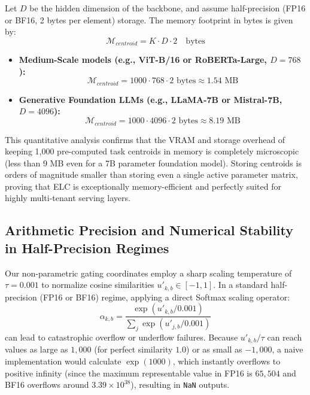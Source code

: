 \documentclass{article}
\theoremstyle{plain}
\theoremstyle{definition}
\theoremstyle{remark}
\begin{document}
Let $D$ be the hidden dimension of the backbone, and assume half-precision (FP16 or BF16, 2 bytes per element) storage. The memory footprint in bytes is given by:
\begin{equation}
  \mathcal{M}_{centroid} = K \cdot D \cdot 2 \quad \text{bytes}
\end{equation}
\begin{itemize}
  \item \textbf{Medium-Scale models (e.g., ViT-B/16 or RoBERTa-Large, $D = 768$):}
  \begin{equation}
    \mathcal{M}_{centroid} = 1000 \cdot 768 \cdot 2 \text{ bytes} \approx 1.54 \text{ MB}
  \end{equation}
  \item \textbf{Generative Foundation LLMs (e.g., LLaMA-7B or Mistral-7B, $D = 4096$):}
  \begin{equation}
    \mathcal{M}_{centroid} = 1000 \cdot 4096 \cdot 2 \text{ bytes} \approx 8.19 \text{ MB}
  \end{equation}
\end{itemize}
This quantitative analysis confirms that the VRAM and storage overhead of keeping 1,000 pre-computed task centroids in memory is completely microscopic (less than 9 MB even for a 7B parameter foundation model). Storing centroids is orders of magnitude smaller than storing even a single active parameter matrix, proving that ELC is exceptionally memory-efficient and perfectly suited for highly multi-tenant serving layers.

\subsection{Arithmetic Precision and Numerical Stability in Half-Precision Regimes}
Our non-parametric gating coordinates employ a sharp scaling temperature of $\tau = 0.001$ to normalize cosine similarities $u'_{k,b} \in [-1, 1]$. In a standard half-precision (FP16 or BF16) regime, applying a direct Softmax scaling operator:
\begin{equation}
  \alpha_{k, b} = \frac{\exp(u'_{k, b} / 0.001)}{\sum_j \exp(u'_{j, b} / 0.001)}
\end{equation}
can lead to catastrophic overflow or underflow failures. Because $u'_{k,b} / \tau$ can reach values as large as $1,000$ (for perfect similarity $1.0$) or as small as $-1,000$, a naive implementation would calculate $\exp(1000)$, which instantly overflows to positive infinity (since the maximum representable value in FP16 is $65,504$ and BF16 overflows around $3.39 \times 10^{38}$), resulting in \texttt{NaN} outputs.
\end{document}
